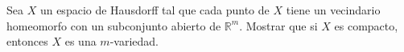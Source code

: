 
    \item Sea \( X \) un espacio de Hausdorff tal que cada punto de \( X \) tiene un vecindario homeomorfo con un subconjunto abierto de \( \mathbb{R}^m \). Mostrar que si \( X \) es compacto, entonces \( X \) es una \( m \)-variedad.
